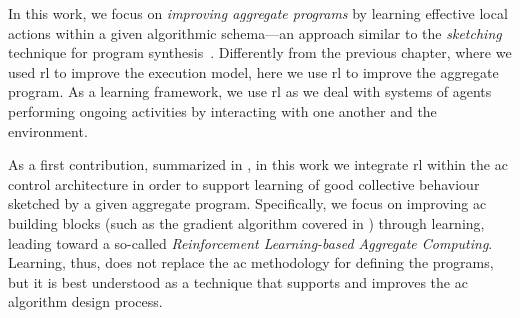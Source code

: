 In this work, we focus on \emph{improving aggregate programs}
 by learning effective local actions
 within a given algorithmic schema---an approach similar to the \emph{sketching} technique for program synthesis~\cite{solar2008program-synthesis-sketching}.
Differently from the previous chapter, 
 where we used \ac{rl} to improve the execution model, 
 here we use \ac{rl} to improve the aggregate program.
As a learning framework,
 we use \ac{rl} as 
 we deal with systems of agents 
 performing ongoing activities 
 by interacting with one another and the environment. 
% 

%

As a first contribution, summarized in , in this work we integrate \ac{rl} within the \ac{ac} control architecture in order to support learning of good collective behaviour sketched by a given aggregate program.
%
Specifically, 
 we focus on improving \ac{ac} building blocks (such as the gradient algorithm covered in ) through learning, leading toward a so-called \emph{Reinforcement Learning-based Aggregate Computing}. 
%
Learning, thus, does not replace the \ac{ac} methodology for defining the programs, 
 but it is best understood as a technique that supports and improves the \ac{ac} algorithm design process. 
